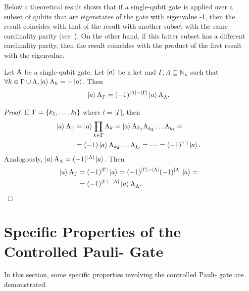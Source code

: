 \documentclass[sigconf,natbib=false]{acmart}
\begin{document}
	Below a theoretical result shows that  if a single-qubit gate is applied over a subset of qubits that are eigenstates of the gate  with eigenvalue -1, then the result coincides with that of the result with another subset with the same cardinality parity (see~\cite{Nielsen_Chuang_2010}). On the other hand, if this latter subset has a different cardinality parity, then the result coincides with the product of the first result with the eigenvalue.
	\begin{proposition}
		Let $\text{A}$ be a single-qubit gate. Let $\ket{a}$ be a ket and $\Gamma, \Lambda \subseteq \mathbb{N}_n$ such that $\forall k \in \Gamma \cup \Lambda, \ket{a} \text{A}_{k} = -\ket{a}$. Then
		\begin{equation}
			\ket{a} \text{A}^{}_{\Gamma} = (-1)^{|\Lambda|-|\Gamma|}\ket{a} \text{A}^{}_{\Lambda}.
		\end{equation}
	\end{proposition}
	\begin{proof}
		If $\Gamma=\{k_1,\dots,k_l\}$ where $l=|\Gamma|$, then
		\begin{align*}
			\ket{a} \text{A}^{}_{\Gamma} &= \ket{a} \prod_{k \in \Gamma} \text{A}_k = \ket{a}\text{A}_{k_1} \text{A}^{}_{k_2}\dots\text{A}^{}_{k_l} =\\
			&= (-1)\ket{a}\text{A}_{k_2}\dots\text{A}^{}_{k_l} =\dots = (-1)^{|\Gamma|} \ket{a}.
		\end{align*}
		Analogously, $\ket{a} \text{A}^{}_{\Lambda} = (-1)^{|\Lambda|} \ket{a}$.
		Then
		\begin{align*}
			\ket{a} \text{A}^{}_{\Gamma} &= (-1)^{|\Gamma|} \ket{a} = (-1)^{|\Gamma|-|\Lambda|}(-1)^{|\Lambda|} \ket{a}=\\
			&=(-1)^{|\Gamma|-|\Lambda|}\ket{a} \text{A}^{}_{\Lambda}.
		\end{align*}
	\end{proof}

	\section{Specific Properties of the Controlled Pauli- Gate} 
 In this section, some specific properties involving  the controlled Pauli- gate are demonstrated.
\end{document}
